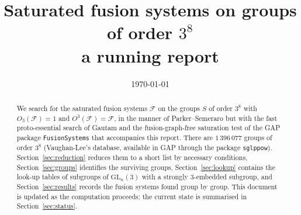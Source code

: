 \documentclass[11pt]{article}
\title{Saturated fusion systems on groups of order $3^8$\\[1ex]
\large a running report}
\author{}
\date{\today}
\theoremstyle{definition}
\theoremstyle{remark}
\newcommand{\F}{\mathcal{F}}
\newcommand{\GL}{\mathrm{GL}}
\begin{document}
\maketitle

\begin{abstract}
We search for the saturated fusion systems $\F$ on the groups $S$ of order
$3^8$ with $O_3(\F)=1$ and $O^3(\F)=\F$, in the manner of
Parker--Semeraro \cite{PS} but with the fast proto-essential search of
Gautam \cite{Gautam} and the fusion-graph-free saturation test of the
GAP package \texttt{FusionSystems} that accompanies this report.  There are
$1\,396\,077$ groups of order $3^8$ (Vaughan-Lee's database, available in
GAP through the package \texttt{sglppow}).  Section~\ref{sec:reduction}
reduces them to a short list by necessary conditions, Section~\ref{sec:groups}
identifies the surviving groups, Section~\ref{sec:lookup} contains the
look-up tables of subgroups of $\GL_n(3)$ with a strongly $3$-embedded
subgroup, and Section~\ref{sec:results} records the fusion systems found
group by group.  This document is updated as the computation proceeds; the
current state is summarised in Section~\ref{sec:status}.
\end{abstract}

\tableofcontents
\end{document}

